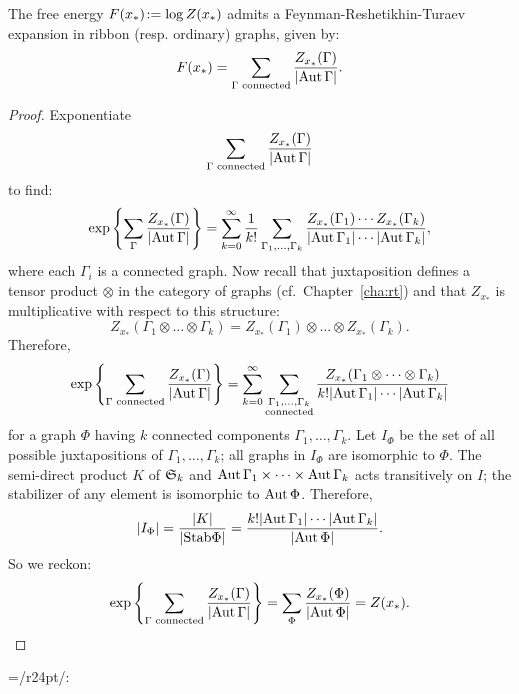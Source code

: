 \begin{lemma}\label{thm:feynman-of-Z}
  The free energy $F(x_*)\joinrel:= \log Z(x_*)$ admits a
  Feynman-Reshetikhin-Turaev expansion in ribbon (resp. ordinary)
  graphs, given by:
  \begin{equation}
    \label{eq:feynman-of-Z}
    F(x_*)
    = \sum_{\Gamma\text{\rmfamily\upshape\ connected}}
    \frac{Z_{x_*}(\Gamma)}{\lvert\operatorname{Aut}\Gamma\rvert}.
  \end{equation} 
\end{lemma}
\begin{proof}
  Exponentiate
  \begin{equation*}
    \sum_{\Gamma\textrm{ connected}}
    \frac{Z_{x_*}(\Gamma)}{\lvert\operatorname{Aut}\Gamma\rvert}
  \end{equation*}
  to find:
  \begin{equation*}
    \exp \left\{\sum_{\Gamma}
      \frac {Z_{x_*} (\Gamma)} {\lvert\operatorname{Aut}\Gamma\rvert}\right\}
    = \sum_{k=0}^\infty \frac{1}{k!} \sum_{\Gamma_1, \dots,
      \Gamma_k} \frac {Z_{x_*}(\Gamma_1) \cdots
      Z_{x_*}(\Gamma_k)} {\lvert\operatorname{Aut}\Gamma_1\rvert \cdots
      \lvert\operatorname{Aut}\Gamma_k\rvert},
  \end{equation*}
  where each $\Gamma_i$ is a connected graph.  Now recall that
  juxtaposition defines a tensor product $\otimes$ in the category of
  graphs (cf.~Chapter~\ref{cha:rt}) and that $Z_{x_*}$ is
  multiplicative with respect to this structure:
    \begin{equation*}
      Z_{x_*} (\Gamma_1 \otimes \dots \otimes \Gamma_k)
      = Z_{x_*} (\Gamma_1) \otimes \dots \otimes Z_{x_*}
      (\Gamma_k).
    \end{equation*}
    Therefore,
    \begin{equation*} 
      \exp\left\{ \sum_{\Gamma\textrm{ connected}}
        \frac {Z_{x_*} (\Gamma)} {\lvert\operatorname{Aut}\Gamma\rvert}\right\} 
      = \sum_{k=0}^\infty 
      \sum_{\substack{\Gamma_1, \dots, \Gamma_k \\ \text{connected}}}
      \frac {Z_{x_*}(\Gamma_1 \otimes \cdots
        \otimes \Gamma_k)} {k! \lvert\operatorname{Aut}\Gamma_1\rvert \cdots
        \lvert\operatorname{Aut}\Gamma_k\rvert}
    \end{equation*}
    for a graph $\Phi$ having $k$ connected components $\Gamma_1, \dots,
    \Gamma_k$.  Let $I_\Phi$ be the set of all possible juxtapositions of
    $\Gamma_1, \ldots, \Gamma_k$; all graphs in $I_\Phi$ are isomorphic to $\Phi$. The
    semi-direct product $K$ of $\mathfrak{S}_{k}$ and $\operatorname{Aut}\Gamma_1 \times \dots \times
    \operatorname{Aut}\Gamma_k$ acts transitively on $I$; the stabilizer of any element
    is isomorphic to $\operatorname{Aut}\Phi$. Therefore,
    \begin{equation*}
      \lvert I_\Phi\rvert = \frac {\lvert K\rvert} {\lvert\textrm{Stab}\Phi\rvert}
      = \frac {k! \lvert\operatorname{Aut}\Gamma_1\rvert \cdots \lvert\operatorname{Aut}\Gamma_k\rvert}
      {\lvert\operatorname{Aut}\Phi\rvert}.
    \end{equation*}
    So we reckon:
    \begin{equation*}
      \exp \left\{\sum_{\Gamma\textrm{ connected}}
        \frac {Z_{x_*} (\Gamma)} {\lvert\operatorname{Aut}\Gamma\rvert}\right\} 
      = \sum_{\Phi} \frac{Z_{x_*}(\Phi)}
      {\lvert\operatorname{Aut}\Phi\rvert}=Z(x_*).
    \end{equation*}
  \end{proof}
  
\everyxy={/r24pt/:} %


